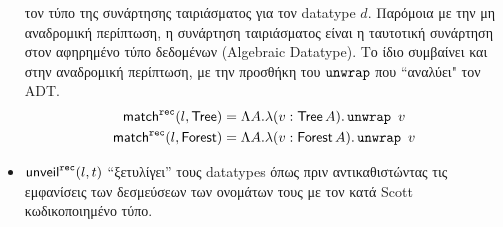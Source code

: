 \begin{itemize}
          τον τύπο της συνάρτησης ταιριάσματος για τον datatype $d$. Παρόμοια
          με την μη αναδρομική περίπτωση, η συνάρτηση ταιριάσματος είναι η
          ταυτοτική  συνάρτηση στον αφηρημένο τύπο δεδομένων (Algebraic
          Datatype). Το ίδιο συμβαίνει και στην αναδρομική περίπτωση, με την
          προσθήκη του  $\operatorname{\texttt{unwrap}}$ που ``αναλύει" τον ADT.  \begin{align*}
            \mathsf{match}^{\operatorname{\texttt{rec}}}(l, \operatorname{\textsf{Tree}}) &= \Lambda A . \lambda (v : \operatorname{\textsf{Tree}} A) . \operatorname{\texttt{unwrap}}\
            v\\ \mathsf{match}^{\operatorname{\texttt{rec}}}(l, \operatorname{\textsf{Forest}}) &= \Lambda A . \lambda (v : \operatorname{\textsf{Forest}} A) .
            \operatorname{\texttt{unwrap}}\ v \end{align*} \item $\mathsf{unveil}^{\operatorname{\texttt{rec}}}(l, t)$ ``ξετυλίγει'' τους
              datatypes όπως πριν αντικαθιστώντας τις εμφανίσεις των δεσμεύσεων
              των ονομάτων τους με τον κατά Scott κωδικοποιημένο τύπο.
  \end{itemize}
